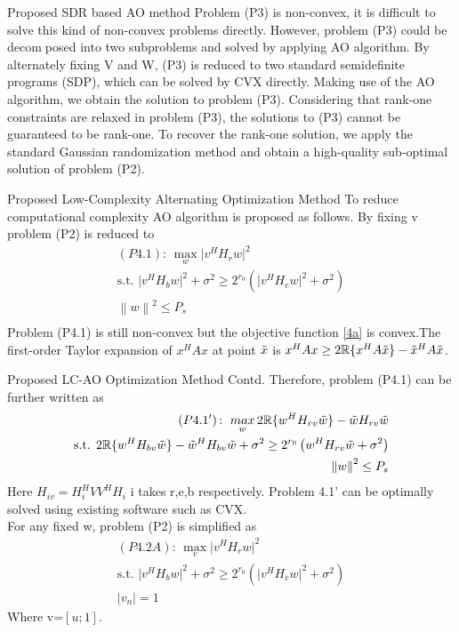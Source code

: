\documentclass{beamer}
\newcommand\norm[1]{\left\lVert#1\right\rVert}
\providecommand{\brak}[1]{\ensuremath{\left(#1\right)}}
\providecommand{\abs}[1]{\vert#1\vert}
\providecommand{\sbrak}[1]{\ensuremath{{}\left[#1\right]}}
\begin{document}
\begin{frame}{Proposed SDR based AO method}
    Problem (P3) is
non-convex, it is difficult to solve this kind of non-convex
problems directly. However, problem (P3) could be decomposed into two subproblems and solved by applying AO
algorithm. By alternately fixing V and W, (P3) is reduced
to two standard semidefinite programs (SDP), which can be
solved by CVX directly. Making use of the AO algorithm,
we obtain the solution to problem (P3). Considering that
rank-one constraints are relaxed in problem (P3), the solutions
to (P3) cannot be guaranteed to be rank-one.  To recover the rank-one solution, we apply the standard Gaussian randomization method and obtain a high-quality sub-optimal solution of problem (P2).
\end{frame}
\begin{frame}{Proposed Low-Complexity Alternating Optimization Method}
    To reduce computational complexity AO algorithm is proposed as follows.
    By fixing v problem (P2) is reduced to
    \begin{align}
    \brak{P4.1}\text{: }\mathop{max}_{w} \abs{v^{H}H_{r}w}^2 \label{4a}\\ 
    \text{s.t. } \abs{v^{H}H_{b}w}^{2}+\sigma^{2}\geq 2^{r_{0}}\brak{ \abs{v^{H}H_{e}w}^{2}+\sigma^{2}}\label{1b}\\
    \norm{w}^{2}\leq P_{s}\\
\end{align}
Problem (P4.1) is still non-convex but the objective function \eqref{4a} is convex.The first-order Taylor
expansion of $x^{H}Ax$ at point $\Tilde{x}$ is $x^{H}Ax\geq 2\mathbb{R}\{x^{H}A\Tilde{x}\}-\Tilde{x}^{H}A\Tilde{x}$. 
\end{frame}
\begin{frame}{Proposed LC-AO Optimization Method Contd.}
                                                       Therefore, problem (P4.1) can be further written as 
 \begin{align}
    \brak{P4.1'}\text{: }\mathop{max}_{w} 2\mathbb{R}\{w^{H}H_{rv}\Tilde{w}\}-\Tilde{w}H_{rv}\Tilde{w}\\
    \text{s.t. } 2\mathbb{R}\{w^{H}H_{bv}\Tilde{w}\}-\Tilde{w}^{H}H_{bv}\Tilde{w}+\sigma^2\geq 2^{r_{0}}\brak{ w^{H}H_{rv}\Tilde{w}+\sigma^{2}}\label{1b}\\
    \norm{w}^{2}\leq P_{s}\\
\end{align}
    Here $H_{iv}=H_{i}^{H}VV^{H}H_{i}$ i takes r,e,b respectively.
    Problem 4.1' can be optimally solved using existing software such as CVX.\\
    For any fixed w, problem (P2) is simplified as
    \begin{align}
    \brak{P4.2A}\text{: }\mathop{max}_{v} \abs{v^{H}H_{r}w}^2 \\ 
    \text{s.t. } \abs{v^{H}H_{b}w}^{2}+\sigma^{2}\geq 2^{r_{0}}\brak{ \abs{v^{H}H_{e}w}^{2}+\sigma^{2}}\\
    \abs{v_{n}}=1
\end{align}
    Where v=\sbrak{u;1}. 
\end{frame}
\end{document}
